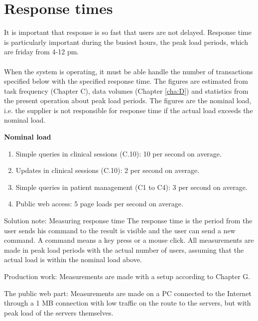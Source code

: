 \documentclass[Main]{subfiles}
\begin{document}
\section{Response times}
It is important that response is so fast that users are not delayed. 
Response time is particularly important during the busiest hours, the peak load periods, which are friday from 4-12 pm.
\\
\\
When the system is operating, it must be able handle the number of transactions specified below with the specified response time. 
The figures are estimated from task frequency (Chapter C), data volumes (Chapter \ref{cha:D}) and statistics from the present operation about peak load periods. 
The figures are the nominal load, i.e. the supplier is not responsible for response time if the actual load exceeds the nominal load.

\textbf{Nominal load}
\begin{enumerate}

\item Simple queries in clinical sessions (C.10): 10 per second on average.

\item Updates in clinical sessions (C.10): 2 per second on average.

\item  Simple queries in patient management (C1 to C4): 3 per second on average.

\item Public web access: 5 page loads per second on average.

\end{enumerate}

Solution note: Measuring response time
The response time is the period from the user sends his command to the result is visible and the user can send a new command. A command means a key press or a mouse click. All measurements are made in peak load periods with the actual number of users, assuming that the actual load is within the nominal load above.

Production work: Measurements are made with a setup according to Chapter G.

The public web part: Measurements are made on a PC connected to the Internet through a 1 MB connection with low traffic on the route to the servers, but with peak load of the servers themselves.
\end{document}
